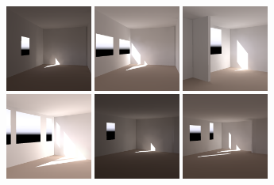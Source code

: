 \documentclass[review]{vgtc}                 %
\begin{document}
\begin{figure}[t]

\includegraphics[width=1.11in]{images/renderings/renovations/065_camera_chris_march.png} %
\includegraphics[width=1.11in]{images/renderings/renovations/065_camera_chris_march_mod.png} %
\hfill
\includegraphics[width=1.11in]{images/renderings/renovations/031_camera_chris_march.png}   %
\includegraphics[width=1.11in]{images/renderings/renovations/031_camera_chris_march_mod.png}   %
\hfill
\includegraphics[width=1.11in]{images/renderings/renovations/063_camera_chris_march.png}   %
\includegraphics[width=1.11in]{images/renderings/renovations/063-2_camera_chris_march_mod.png}   %


\end{figure}
\end{document}
